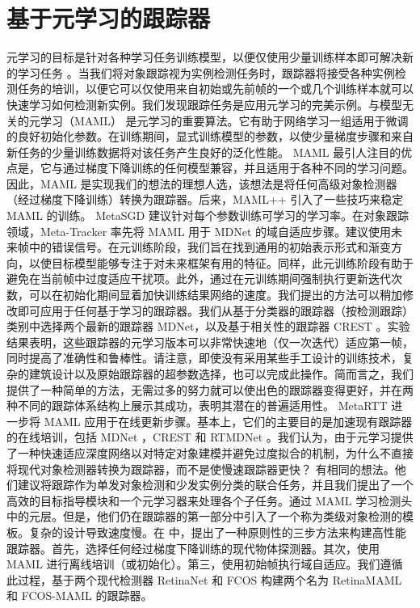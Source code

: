 \section{基于元学习的跟踪器} %
元学习的目标是针对各种学习任务训练模型，以便仅使用少量训练样本即可解决新的学习任务 \cite{MAML}。当我们将对象跟踪视为实例检测任务时，跟踪器将接受各种实例检测任务的培训，以便它可以仅使用来自初始或先前帧的一个或几个训练样本就可以快速学习如何检测新实例。我们发现跟踪任务是应用元学习的完美示例。与模型无关的元学习（MAML）\cite{MAML} 是元学习的重要算法。它有助于网络学习一组适用于微调的良好初始化参数。在训练期间，显式训练模型的参数，以使少量梯度步骤和来自新任务的少量训练数据将对该任务产生良好的泛化性能。 MAML 最引人注目的优点是，它与通过梯度下降训练的任何模型兼容，并且适用于各种不同的学习问题。因此，MAML 是实现我们的想法的理想人选，该想法是将任何高级对象检测器（经过梯度下降训练）转换为跟踪器。后来，MAML++ \cite{MAML++} 引入了一些技巧来稳定 MAML 的训练。 MetaSGD \cite{MetaSGD} 建议针对每个参数训练可学习的学习率。在对象跟踪领域，Meta-Tracker \cite{MetaTracker} 率先将 MAML 用于 MDNet \cite{MDNet} 的域自适应步骤。建议使用未来帧中的错误信号。在元训练阶段，我们旨在找到通用的初始表示形式和渐变方向，以使目标模型能够专注于对未来框架有用的特征。同样，此元训练阶段有助于避免在当前帧中过度适应干扰项。此外，通过在元训练期间强制执行更新迭代次数，可以在初始化期间显着加快训练结果网络的速度。我们提出的方法可以稍加修改即可应用于任何基于学习的跟踪器。我们从基于分类器的跟踪器（按检测跟踪）类别中选择两个最新的跟踪器 MDNet，以及基于相关性的跟踪器 CREST \cite{CREST}。实验结果表明，这些跟踪器的元学习版本可以非常快速地（仅一次迭代）适应第一帧，同时提高了准确性和鲁棒性。请注意，即使没有采用某些手工设计的训练技术，复杂的建筑设计以及原始跟踪器的超参数选择，也可以完成此操作。简而言之，我们提供了一种简单的方法，无需过多的努力就可以使出色的跟踪器变得更好，并在两种不同的跟踪体系结构上展示其成功，表明其潜在的普遍适用性。 MetaRTT \cite{MetaRTT} 进一步将 MAML 应用于在线更新步骤。基本上，它们的主要目的是加速现有跟踪器的在线培训，包括 MDNet \cite{MDNet}，CREST \cite{CREST} 和 RTMDNet \cite{RTMDNet}。我们认为，由于元学习提供了一种快速适应深度网络以对特定对象建模并避免过度拟合的机制，为什么不直接将现代对象检测器转换为跟踪器，而不是使慢速跟踪器更快？\cite{huang2019bridging} 有相同的想法。他们建议将跟踪作为单发对象检测和少发实例分类的联合任务，并且我们提出了一个高效的目标指导模块和一个元学习器来处理各个子任务。通过 MAML 学习检测头中的元层。但是，他们仍在跟踪器的第一部分中引入了一个称为类级对象检测的模板。复杂的设计导致速度慢。在 \cite{TrackingBy} 中，提出了一种原则性的三步方法来构建高性能跟踪器。首先，选择任何经过梯度下降训练的现代物体探测器。其次，使用 MAML 进行离线培训（或初始化）。第三，使用初始帧执行域自适应。我们遵循此过程，基于两个现代检测器 RetinaNet \cite{focal} 和 FCOS \cite{tian2019fcos} 构建两个名为 RetinaMAML 和 FCOS-MAML 的跟踪器。
